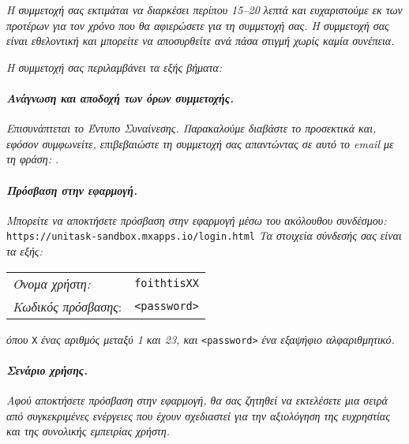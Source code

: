             \textit{Η συμμετοχή σας εκτιμάται να διαρκέσει περίπου 15--20 λεπτά και ευχαριστούμε εκ των προτέρων για τον χρόνο που θα αφιερώσετε για τη συμμετοχή σας. Η συμμετοχή σας είναι εθελοντική και μπορείτε να αποσυρθείτε ανά πάσα στιγμή χωρίς καμία συνέπεια.}

            \textit{Η συμμετοχή σας περιλαμβάνει τα εξής βήματα:}

            \paragraph{\textit{Ανάγνωση και αποδοχή των όρων συμμετοχής.}}
                \textit{Επισυνάπτεται το Έντυπο Συναίνεσης. Παρακαλούμε διαβάστε το προσεκτικά και, εφόσον συμφωνείτε, επιβεβαιώστε τη συμμετοχή σας απαντώντας σε αυτό το email με τη φράση: .}

            \paragraph{\textit{Πρόσβαση στην εφαρμογή.}}
                \textit{Μπορείτε να αποκτήσετε πρόσβαση στην εφαρμογή μέσω του ακόλουθου συνδέσμου:} \texttt{https://unitask-sandbox.mxapps.io/login.html} \textit{Τα στοιχεία σύνδεσής σας είναι τα εξής:}

            \begin{table}[H] \noindent
                \begin{tabular}{ll}
                    \textit{Όνομα χρήστη:} & \texttt{foithtisXX} \\
                    \textit{Κωδικός πρόσβασης}: & \texttt{<password>}
                \end{tabular}
            \end{table}

            \noindent \textit{όπου} \texttt{X} \textit{ένας αριθμός μεταξύ 1 και 23, και} \texttt{<password>} \textit{ένα εξαψήφιο αλφαριθμητικό.}

            \paragraph{\textit{Σενάριο χρήσης.}}
                \textit{Αφού αποκτήσετε πρόσβαση στην εφαρμογή, θα σας ζητηθεί να εκτελέσετε μια σειρά από συγκεκριμένες ενέργειες που έχουν σχεδιαστεί για την αξιολόγηση της ευχρηστίας και της συνολικής εμπειρίας χρήστη.}


